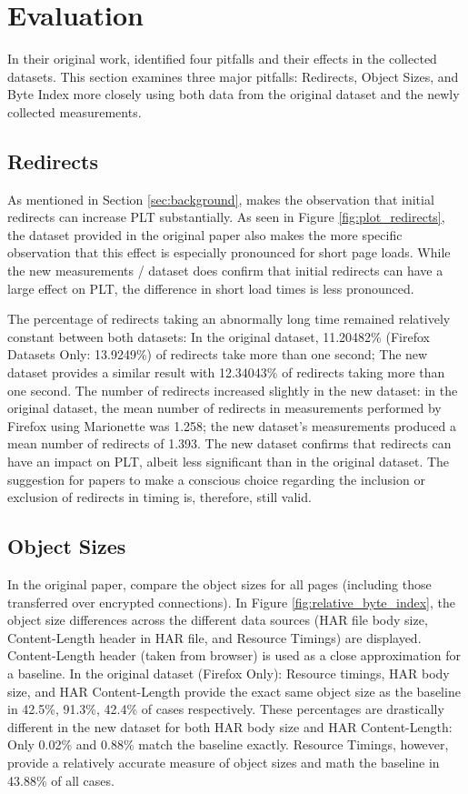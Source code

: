 \section{Evaluation}
In their original work, \citeauthor{10.1007/978-3-030-15986-3_19} identified four pitfalls and their effects in the collected datasets. This section examines three major pitfalls: Redirects, Object Sizes, and Byte Index more closely using both data from the original dataset and the newly collected measurements. 

\subsection{Redirects}
As mentioned in Section \ref{sec:background}, \citeauthor{10.1007/978-3-030-15986-3_19} makes the observation that initial redirects can increase PLT substantially. As seen in Figure \ref{fig:plot_redirects}, the dataset provided in the original paper also makes the more specific observation that this effect is especially pronounced for short page loads. While the new measurements / dataset does confirm that initial redirects can have a large effect on PLT, the difference in short load times is less pronounced. 

The percentage of redirects taking an abnormally long time remained relatively constant between both datasets: In the original dataset, 11.20482\% (Firefox Datasets Only: 13.9249\%) of redirects take more than one second; The new dataset provides a similar result with 12.34043\% of redirects taking more than one second. The number of redirects increased slightly in the new dataset: in the original dataset, the mean number of redirects in measurements performed by Firefox using Marionette was 1.258; the new dataset's measurements produced a mean number of redirects of 1.393. The new dataset confirms that redirects can have an impact on PLT, albeit less significant than in the original dataset. The suggestion for papers to make a conscious choice regarding the inclusion or exclusion of redirects in timing is, therefore, still valid.

\subsection{Object Sizes}
In the original paper, \citeauthor{10.1007/978-3-030-15986-3_19} compare the object sizes for all pages (including those transferred over encrypted connections). In Figure \ref{fig:relative_byte_index}, the object size differences across the different data sources (HAR file body size, Content-Length header in HAR file, and Resource Timings) are displayed. Content-Length header (taken from browser) is used as a close approximation for a baseline. In the original dataset (Firefox Only): Resource timings, HAR body size, and HAR Content-Length provide the exact same object size as the baseline in 42.5\%, 91.3\%, 42.4\% of cases respectively. These percentages are drastically different in the new dataset for both HAR body size and HAR Content-Length: Only 0.02\% and 0.88\% match the baseline exactly. Resource Timings, however, provide a relatively accurate measure of object sizes and math the baseline in 43.88\% of all cases.

